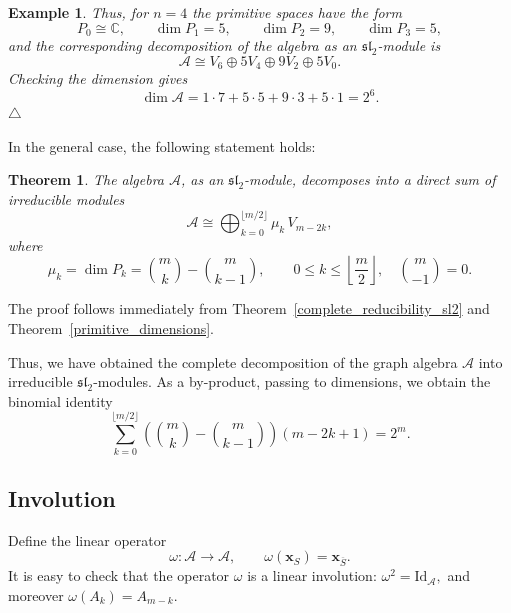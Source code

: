 \documentclass[10pt,a4paper]{amsart}
\newtheorem{theorem}{Theorem}[section]
\newtheorem{example}{Example}[section]
\begin{document}
\begin{example}
{Thus, for $n=4$ the primitive spaces have the form
$$
P_0\cong \mathbb C,\qquad
\dim P_1=5,\qquad
\dim P_2=9,\qquad
\dim P_3=5,
$$
and the corresponding decomposition of the algebra as an
$\mathfrak{sl}_2$-module is
$$
\mathcal A
\cong
V_6\oplus 5V_4\oplus 9V_2\oplus 5V_0.
$$
Checking the dimension gives
$$
\dim\mathcal A
=
1\cdot 7+5\cdot 5+9\cdot 3+5\cdot 1
=
2^6.
$$
}
$\triangle$ \end{example}


In the general case, the following statement holds:

\begin{theorem}\label{irred_decomp_A}
The algebra $\mathcal A$, as an $\mathfrak{sl}_2$-module, decomposes into a
direct sum of irreducible modules
\begin{equation}
\mathcal A
\cong
\bigoplus_{k=0}^{\lfloor m/2\rfloor}
\mu_k\,V_{m-2k},
\end{equation}
where
\begin{equation}
\mu_k
=
\dim P_k
=
\binom{m}{k}-\binom{m}{k-1},
\qquad
0\le k\le \left\lfloor\frac m2\right\rfloor, \quad \binom{m}{-1}=0.
\end{equation}
\end{theorem}

The proof follows immediately from Theorem~\ref{complete_reducibility_sl2}
and Theorem~\ref{primitive_dimensions}.

Thus, we have obtained the complete decomposition of the graph algebra
$\mathcal A$ into irreducible $\mathfrak{sl}_2$-modules.
As a by-product, passing to dimensions, we obtain the  binomial
identity
$$
\sum_{k=0}^{\lfloor m/2\rfloor}
\left(\binom{m}{k}-\binom{m}{k-1}\right)(m-2k+1)=2^m.
$$


\subsection{Involution}

Define the linear operator
\begin{equation}\label{involution}
\omega:\mathcal A\to\mathcal A,
\qquad
\omega(\boldsymbol{x}_S)=\boldsymbol{x}_{\overline S}.
\end{equation}
It is easy to check that the operator $\omega$ is a linear involution:
$
\omega^2=\mathrm{Id}_{\mathcal A},
$
and moreover
$
\omega(A_k)=A_{m-k}.
$
\end{document}
